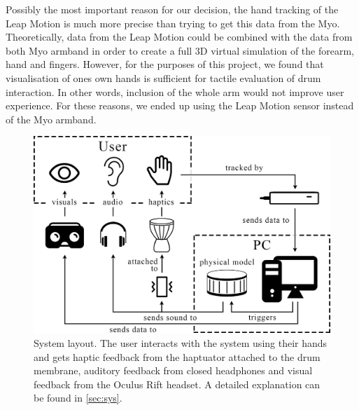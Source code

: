 \documentclass{vgtc}
\begin{document}
Possibly the most important reason for our decision, the hand tracking of the Leap Motion is much more precise than trying to get this data from the Myo. Theoretically, data from the Leap Motion could be combined with the data from both Myo armband in order to create a full 3D virtual simulation of the forearm, hand and fingers. However, for the purposes of this project, we found that visualisation of ones own hands is sufficient for tactile evaluation of drum interaction. In other words, inclusion of the whole arm would not improve user experience. For these reasons, we ended up using the Leap Motion sensor instead of the Myo armband.
\begin{figure}[h]
\includegraphics[width=1.0\columnwidth]{systemlayout-updated.png}
\caption{System layout. The user interacts with the system using their hands and gets haptic feedback from the haptuator attached to the drum membrane, auditory feedback from closed headphones and visual feedback from the Oculus Rift headset. A detailed explanation can be found in \autoref{sec:sys}.}
\centering
\label{fig:systemLayout}
\end{figure}
\end{document}
